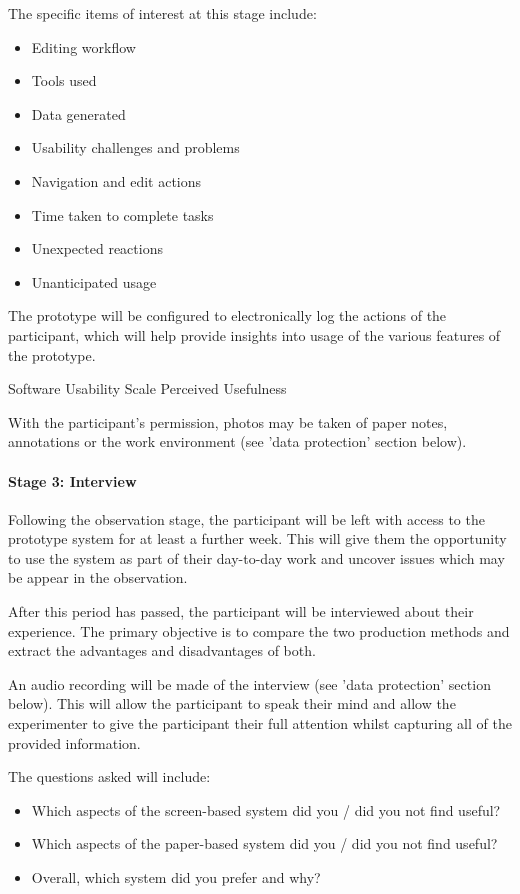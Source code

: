 The specific items of interest at this stage include:
\begin{itemize}
\item Editing workflow
\item Tools used
\item Data generated
\item Usability challenges and problems
\item Navigation and edit actions
\item Time taken to complete tasks
\item Unexpected reactions
\item Unanticipated usage
\end{itemize}

The prototype will be configured to electronically log the actions of the
participant, which will help provide insights into usage of the various
features of the prototype.

Software Usability Scale \citep{Brooke1996}
Perceived Usefulness \citep{Davis1989}

With the participant's permission, photos may be taken of paper notes,
annotations or the work environment (see 'data protection' section below).

\paragraph{Stage 3: Interview}
Following the observation stage, the participant will be left with access to
the prototype system for at least a further week. This will give them the
opportunity to use the system as part of their day-to-day work and uncover
issues which may be appear in the observation.

After this period has passed, the participant will be interviewed about their
experience. The primary objective is to compare the two production methods and
extract the advantages and disadvantages of both.

An audio recording will be made of the interview (see 'data protection' section
below). This will allow the participant to speak their mind and allow the
experimenter to give the participant their full attention whilst capturing all
of the provided information.

The questions asked will include:
\begin{itemize}
\item Which aspects of the screen-based system did you / did you not find useful?
\item Which aspects of the paper-based system did you / did you not find useful?
\item Overall, which system did you prefer and why?
\end{itemize}


